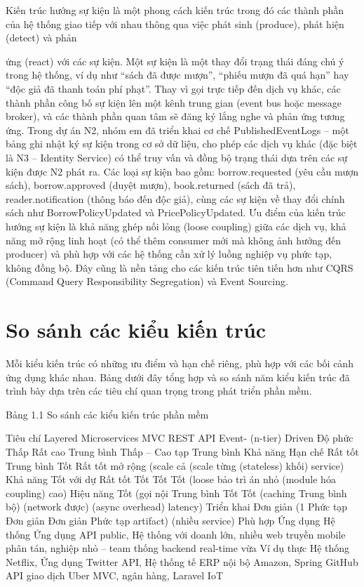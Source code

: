 Kiến trúc hướng sự kiện là một phong cách kiến trúc trong đó các thành phần của hệ thống giao tiếp với nhau thông qua việc phát sinh (produce), phát hiện (detect) và phản

ứng (react) với các sự kiện. Một sự kiện là một thay đổi trạng thái đáng chú ý trong hệ thống, ví dụ như “sách đã được mượn”, “phiếu mượn đã quá hạn” hay “độc giả đã thanh toán phí phạt”. Thay vì gọi trực tiếp đến dịch vụ khác, các thành phần công bố sự kiện lên một kênh trung gian (event bus hoặc message broker), và các thành phần quan tâm sẽ đăng ký lắng nghe và phản ứng tương ứng. Trong dự án N2, nhóm em đã triển khai cơ chế PublishedEventLogs – một bảng ghi nhật ký sự kiện trong cơ sở dữ liệu, cho phép các dịch vụ khác (đặc biệt là N3 – Identity Service) có thể truy vấn và đồng bộ trạng thái dựa trên các sự kiện được N2 phát ra. Các loại sự kiện bao gồm: borrow.requested (yêu cầu mượn sách), borrow.approved (duyệt mượn), book.returned (sách đã trả), reader.notification (thông báo đến độc giả), cùng các sự kiện về thay đổi chính sách như BorrowPolicyUpdated và PricePolicyUpdated. Ưu điểm của kiến trúc hướng sự kiện là khả năng ghép nối lỏng (loose coupling) giữa các dịch vụ, khả năng mở rộng linh hoạt (có thể thêm consumer mới mà không ảnh hưởng đến producer) và phù hợp với các hệ thống cần xử lý luồng nghiệp vụ phức tạp, không đồng bộ. Đây cũng là nền tảng cho các kiến trúc tiên tiến hơn như CQRS (Command Query Responsibility Segregation) và Event Sourcing.

\section{So sánh các kiểu kiến trúc}

Mỗi kiểu kiến trúc có những ưu điểm và hạn chế riêng, phù hợp với các bối cảnh ứng dụng khác nhau. Bảng dưới đây tổng hợp và so sánh năm kiểu kiến trúc đã trình bày dựa trên các tiêu chí quan trọng trong phát triển phần mềm.

Bảng 1.1 So sánh các kiểu kiến trúc phần mềm

Tiêu chí Layered Microservices MVC REST API Event- (n-tier) Driven Độ phức Thấp Rất cao Trung bình Thấp – Cao tạp Trung bình Khả năng Hạn chế Rất tốt Trung bình Tốt Rất tốt mở rộng (scale cả (scale từng (stateless) khối) service) Khả năng Tốt với dự Rất tốt Tốt Tốt Tốt (loose bảo trì án nhỏ (module hóa coupling) cao) Hiệu năng Tốt (gọi nội Trung bình Tốt Tốt (caching Trung bình bộ) (network được) (async overhead) latency) Triển khai Đơn giản (1 Phức tạp Đơn giản Đơn giản Phức tạp artifact) (nhiều service) Phù hợp Ứng dụng Hệ thống Ứng dụng API public, Hệ thống với doanh lớn, nhiều web truyền mobile phân tán, nghiệp nhỏ – team thống backend real-time vừa Ví dụ thực Hệ thống Netflix, Ứng dụng Twitter API, Hệ thống tế ERP nội bộ Amazon, Spring GitHub API giao dịch Uber MVC, ngân hàng, Laravel IoT

